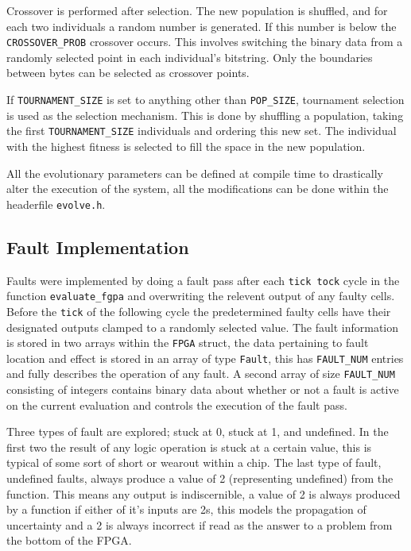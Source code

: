 Crossover is performed after selection. The new population is shuffled,
and for each two individuals a random number is generated. If this number
is below the \texttt{CROSSOVER\_PROB} crossover occurs. This involves
switching the binary data from a randomly selected point in each individual's
bitstring. Only the boundaries between bytes can be selected as crossover points.

If \texttt{TOURNAMENT\_SIZE} is set to anything other than \texttt{POP\_SIZE},
tournament selection is used as the selection mechanism. This is done by
shuffling a population, taking the first \texttt{TOURNAMENT\_SIZE} individuals
and ordering this new set. The individual with the highest fitness is selected to fill
the space in the new population.

All the evolutionary parameters can be defined at compile time to drastically
alter the execution of the system, all the modifications can be done within
the headerfile \texttt{evolve.h}.

\subsection{Fault Implementation}
Faults were implemented by doing a fault pass after each \texttt{tick tock} cycle in
the function \texttt{evaluate\_fgpa} and
overwriting the relevent output of any faulty cells. Before the \texttt{tick} of the
following cycle the predetermined faulty cells have their designated outputs
clamped to a randomly selected value. The fault information is stored in
two arrays within the \texttt{FPGA} struct, the data pertaining to fault
location and effect is stored in an array of type \texttt{Fault}, this has
\texttt{FAULT\_NUM} entries and fully describes the operation of any fault.
A second array of size \texttt{FAULT\_NUM} consisting of integers contains
binary data about whether or not a fault is active on the current evaluation
and controls the execution of the fault pass.

Three types of fault are explored; stuck at 0, stuck at 1, and undefined. In
the first two the result of any logic operation is stuck at a certain value, this
is typical of some sort of short or wearout within a chip. The last type of fault,
undefined faults, always produce a value of 2 (representing undefined) from the function. This means any
output is indiscernible, a value of 2 is always produced by a function if either
of it's inputs are 2s, this models the propagation of uncertainty and a 2 is always
incorrect if read as the answer to a problem from the bottom of the FPGA.

